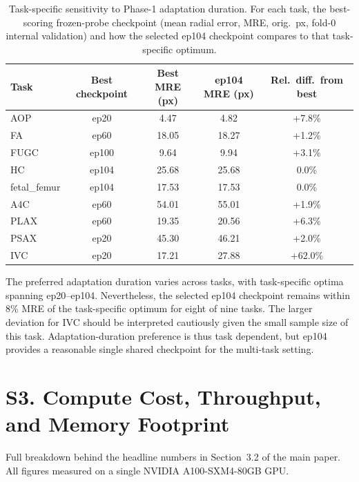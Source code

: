 \documentclass[runningheads]{llncs}
\begin{document}
\begin{table}[h]
\caption{Task-specific sensitivity to Phase-1 adaptation duration. For each
task, the best-scoring frozen-probe checkpoint (mean radial error, MRE, orig.\
px, fold-0 internal validation) and how the selected ep104 checkpoint
compares to that task-specific optimum.}
\label{tab:supp-per-task-duration}
\centering
\begin{tabular}{@{}lcccc@{}}
\toprule
Task & Best checkpoint & Best MRE (px) & ep104 MRE (px) & Rel.\ diff.\ from best \\
\midrule
AOP         & ep20  & 4.47  & 4.82  & +7.8\% \\
FA          & ep60  & 18.05 & 18.27 & +1.2\% \\
FUGC        & ep100 & 9.64  & 9.94  & +3.1\% \\
HC          & ep104 & 25.68 & 25.68 & 0.0\% \\
fetal\_femur & ep104 & 17.53 & 17.53 & 0.0\% \\
A4C         & ep60  & 54.01 & 55.01 & +1.9\% \\
PLAX        & ep60  & 19.35 & 20.56 & +6.3\% \\
PSAX        & ep20  & 45.30 & 46.21 & +2.0\% \\
IVC         & ep20  & 17.21 & 27.88 & +62.0\% \\
\bottomrule
\end{tabular}
\end{table}

The preferred adaptation duration varies across tasks, with task-specific
optima spanning ep20--ep104. Nevertheless, the selected ep104 checkpoint
remains within 8\% MRE of the task-specific optimum for eight of nine tasks.
The larger deviation for IVC should be interpreted cautiously given the
small sample size of this task. Adaptation-duration preference is thus task
dependent, but ep104 provides a reasonable single shared checkpoint for the
multi-task setting.

\section*{S3. Compute Cost, Throughput, and Memory Footprint}

Full breakdown behind the headline numbers in Section~3.2 of the main paper.
All figures measured on a single NVIDIA A100-SXM4-80GB GPU.
\end{document}

